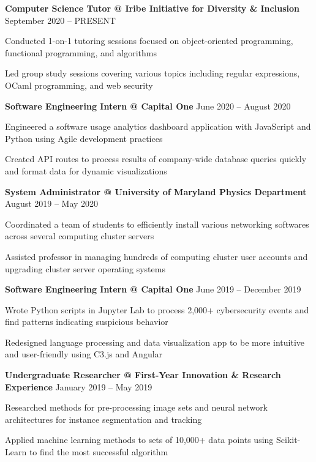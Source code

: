 \documentclass{article}
\newcommand{\employer}[4]{{
\vspace*{2pt}%
\textbf{#1} #2 \hfill #3\\ #4 \vspace*{2pt}}
}
\renewcommand{\labelitemii}{
$\vcenter{\hbox{\tiny$\bullet$}}$\hspace*{-3pt}
}
\newenvironment{bullet-list-minor}{
\begin{list}{\labelitemii}{\setlength\leftmargin{15pt} 
\topsep 0pt \itemsep -2pt}}{\vspace*{4pt}\end{list}
}
\begin{document}
    \employer{Computer Science Tutor @ Iribe Initiative for Diversity \& Inclusion}{}{September 2020 -- PRESENT}{}
	\begin{bullet-list-minor}
	\item Conducted 1-on-1 tutoring sessions focused on object-oriented programming, functional programming, and algorithms
    \item Led group study sessions covering various topics including regular expressions, OCaml programming, and web security
    \end{bullet-list-minor}
    \smallskip
    \employer{Software Engineering Intern @ Capital One}{}{June 2020 -- August 2020}{}
	\begin{bullet-list-minor}
	\item Engineered a software usage analytics dashboard application with JavaScript and Python using Agile development practices
	\item Created API routes to process results of company-wide database queries quickly and format data for dynamic visualizations
    \end{bullet-list-minor}
    \smallskip
    \employer{System Administrator @ University of Maryland Physics Department}{}{August 2019 -- May 2020}{}
	\begin{bullet-list-minor}
	\item Coordinated a team of students to efficiently install various networking softwares across several computing cluster servers
	\item Assisted professor in managing hundreds of computing cluster user accounts and upgrading cluster server operating systems
    \end{bullet-list-minor}
    \smallskip  
    \employer{Software Engineering Intern @ Capital One}{}{June 2019 -- December 2019}{}
	\begin{bullet-list-minor}
	\item Wrote Python scripts in Jupyter Lab to process 2,000+  cybersecurity events and find patterns indicating suspicious behavior
	\item Redesigned language processing and data visualization app to be more intuitive and user-friendly using C3.js and Angular
    \end{bullet-list-minor}
    \smallskip    
    \employer{Undergraduate Researcher @ First-Year Innovation \& Research Experience}{}{January 2019 -- May 2019}{}
	\begin{bullet-list-minor}
	\item Researched methods for pre-processing image sets and neural network architectures for instance segmentation and tracking
	\item Applied machine learning methods to sets of 10,000+ data points using Scikit-Learn to find the most successful algorithm
    \end{bullet-list-minor}
\end{document}
